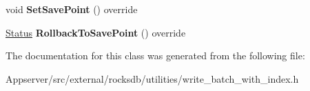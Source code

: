 \begin{DoxyCompactItemize}
\item 
void {\bfseries Set\+Save\+Point} () override\hypertarget{classrocksdb_1_1WriteBatchWithIndex_a1390ea750181a1298563d759eb23a6c3}{}\label{classrocksdb_1_1WriteBatchWithIndex_a1390ea750181a1298563d759eb23a6c3}

\item 
\hyperlink{classrocksdb_1_1Status}{Status} {\bfseries Rollback\+To\+Save\+Point} () override\hypertarget{classrocksdb_1_1WriteBatchWithIndex_af53563fdeb95c10fa3e7b7a96ab5beaa}{}\label{classrocksdb_1_1WriteBatchWithIndex_af53563fdeb95c10fa3e7b7a96ab5beaa}

\end{DoxyCompactItemize}


The documentation for this class was generated from the following file\+:\begin{DoxyCompactItemize}
\item 
Appserver/src/external/rocksdb/utilities/write\+\_\+batch\+\_\+with\+\_\+index.\+h\end{DoxyCompactItemize}

